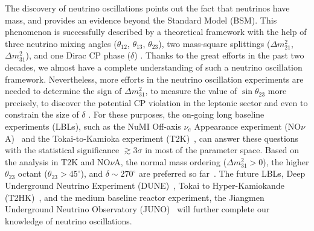 \documentclass[aps,prd,nofootinbib,preprint]{revtex4}
\begin{document}
The discovery of neutrino oscillations points out the fact that neutrinos have mass, and provides an evidence beyond the Standard Model (BSM). This phenomenon is successfully described by a theoretical framework with the help of three neutrino mixing angles ($\theta_{12}$, $\theta_{13}$, $\theta_{23}$), two mass-square splittings ($\Delta m_{21}^2$, $\Delta m_{31}^2$), and one Dirac CP phase ($\delta$) \cite{Pontecorvo:1967fh,Maki:1962mu,Pontecorvo:1957qd,Esteban:2018azc}. Thanks to the great efforts in the past two decades, we almost have a complete understanding of such a neutrino oscillation framework. Nevertheless, more efforts in the neutrino oscillation experiments are needed to determine the sign of $\Delta m_{31}^2$, to measure the value of $\sin\theta_{23}$ more precisely, to discover the potential CP violation in the leptonic sector and even to constrain the size of $\delta$ \cite{Esteban:2018azc}. For these purposes, the on-going long baseline experiments (LBLs), such as the NuMI Off-axis $\nu_e$ Appearance experiment (NO$\nu$A)~\cite{Ayres:2007tu} and the Tokai-to-Kamioka experiment (T2K)~\cite{Abe:2011ks}, can answer these questions with the statistical significance $\gtrsim 3\sigma$ in most of the parameter space. Based on the analysis in T2K and NO$\nu$A, the normal mass ordering ($\Delta m_{31}^2>0$), the higher $\theta_{23}$ octant ($\theta_{23}>45^\circ$), and $\delta\sim270^\circ$ are preferred so far~\cite{Esteban:2018azc}. The future LBLs, Deep Underground Neutrino Experiment (DUNE)~\cite{Acciarri:2015uup}, Tokai to Hyper-Kamiokande (T2HK)~\cite{Abe:2014oxa}, and the medium baseline reactor experiment, the Jiangmen Underground Neutrino Observatory (JUNO)~\cite{Djurcic:2015vqa,An:2015jdp} will further complete our knowledge of neutrino oscillations.
\end{document}
